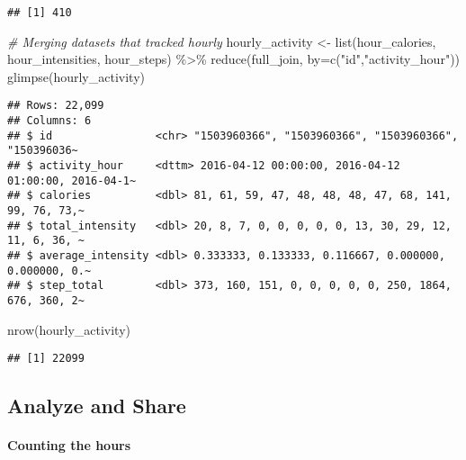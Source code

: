 \documentclass[
]{article}
\newenvironment{Shaded}{\begin{snugshade}}{\end{snugshade}}
\newcommand{\AttributeTok}[1]{\textcolor[rgb]{0.77,0.63,0.00}{#1}}
\newcommand{\CommentTok}[1]{\textcolor[rgb]{0.56,0.35,0.01}{\textit{#1}}}
\newcommand{\FunctionTok}[1]{\textcolor[rgb]{0.00,0.00,0.00}{#1}}
\newcommand{\NormalTok}[1]{#1}
\newcommand{\OtherTok}[1]{\textcolor[rgb]{0.56,0.35,0.01}{#1}}
\newcommand{\SpecialCharTok}[1]{\textcolor[rgb]{0.00,0.00,0.00}{#1}}
\newcommand{\StringTok}[1]{\textcolor[rgb]{0.31,0.60,0.02}{#1}}
\begin{document}
\begin{verbatim}
## [1] 410
\end{verbatim}

\begin{Shaded}
\begin{Highlighting}[]
\CommentTok{\# Merging datasets that tracked hourly}
\NormalTok{hourly\_activity }\OtherTok{\textless{}{-}} \FunctionTok{list}\NormalTok{(hour\_calories, hour\_intensities, hour\_steps) }\SpecialCharTok{\%\textgreater{}\%}
  \FunctionTok{reduce}\NormalTok{(full\_join, }\AttributeTok{by=}\FunctionTok{c}\NormalTok{(}\StringTok{"id"}\NormalTok{,}\StringTok{"activity\_hour"}\NormalTok{))}
\FunctionTok{glimpse}\NormalTok{(hourly\_activity)}
\end{Highlighting}
\end{Shaded}

\begin{verbatim}
## Rows: 22,099
## Columns: 6
## $ id                <chr> "1503960366", "1503960366", "1503960366", "150396036~
## $ activity_hour     <dttm> 2016-04-12 00:00:00, 2016-04-12 01:00:00, 2016-04-1~
## $ calories          <dbl> 81, 61, 59, 47, 48, 48, 48, 47, 68, 141, 99, 76, 73,~
## $ total_intensity   <dbl> 20, 8, 7, 0, 0, 0, 0, 0, 13, 30, 29, 12, 11, 6, 36, ~
## $ average_intensity <dbl> 0.333333, 0.133333, 0.116667, 0.000000, 0.000000, 0.~
## $ step_total        <dbl> 373, 160, 151, 0, 0, 0, 0, 0, 250, 1864, 676, 360, 2~
\end{verbatim}

\begin{Shaded}
\begin{Highlighting}[]
\FunctionTok{nrow}\NormalTok{(hourly\_activity)}
\end{Highlighting}
\end{Shaded}

\begin{verbatim}
## [1] 22099
\end{verbatim}

\hypertarget{analyze-and-share}{%
\subsection{Analyze and Share}\label{analyze-and-share}}

\hypertarget{counting-the-hours}{%
\paragraph{Counting the hours}\label{counting-the-hours}}
\end{document}
